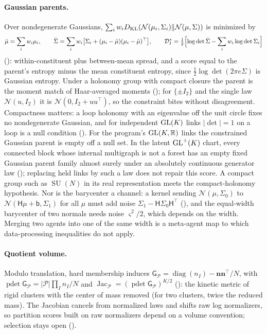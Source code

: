 \paragraph{Gaussian parents.} Over nondegenerate Gaussians,
\(\sum_iw_iD_{\mathrm{KL}}(\mathcal N(\mu_i,\Sigma_i)\Vert\mathcal N(\mu,\Sigma))\) is minimized by
\[
\bar\mu=\sum_iw_i\mu_i,\qquad
\bar\Sigma=\sum_iw_i\bigl[\Sigma_i+(\mu_i-\bar\mu)(\mu_i-\bar\mu)^\top\bigr],\qquad
\mathcal D_I^\star=\tfrac12\Bigl[\log\det\bar\Sigma-\sum_iw_i\log\det\Sigma_i\Bigr]
\]
(): within-constituent plus between-mean spread, and a score equal to the
parent's entropy minus the mean constituent entropy, since \(\tfrac12\log\det(2\pi e\Sigma)\) is Gaussian entropy. Under
a holonomy group with compact closure the parent is the moment match of Haar-averaged moments
(); for \(\{\pm I_2\}\) and the single law \(\mathcal N(u,I_2)\) it is
\(\mathcal N(0,I_2+uu^\top)\), so the constraint bites without disagreement. Compactness matters: a loop holonomy with
an eigenvalue off the unit circle fixes no nondegenerate Gaussian, and for independent \(\mathrm{GL}(K)\) links
\(\lvert\det\rvert=1\) on a loop is a null condition (). For the program's
\(\mathrm{GL}(K,\mathbb R)\) links the constrained Gaussian parent is empty off a null set. In the latent
\(\mathrm{GL}^+(K)\) chart, every connected block whose internal multigraph is not a forest has an empty
fixed Gaussian parent family almost surely under an absolutely continuous generator law
(); replacing held links by such a law does not repair
this score. A compact group such as \(\operatorname{SU}(N)\) in its real representation meets the
compact-holonomy hypothesis. Nor is the barycenter a channel: a kernel
sending \(\mathcal N(\mu,\Sigma_0)\) to \(\mathcal N(\mathsf H\mu+\mathsf b,\Sigma_1)\) for all \(\mu\) must add noise
\(\Sigma_1-\mathsf H\Sigma_0\mathsf H^\top\) (), and the equal-width barycenter of two
normals needs noise \(\varsigma^2/2\), which depends on the width. Merging two agents into one of the same width is a
meta-agent map to which data-processing inequalities do not apply.

\paragraph{Quotient volume.} Modulo translation, hard membership induces
\(\mathsf G_{\mathcal P}=\operatorname{diag}(n_I)-\mathbf n\mathbf n^\top/N\), with
\(\operatorname{pdet}\mathsf G_{\mathcal P}=\lvert\mathcal P\rvert\prod_In_I/N\) and
\(\operatorname{Jac}_{\mathcal P}=(\operatorname{pdet}\mathsf G_{\mathcal P})^{K/2}\) (): the kinetic
metric of rigid clusters with the center of mass removed (for two clusters, twice the reduced mass). The Jacobian
cancels from normalized laws and shifts raw log normalizers, so partition scores built on raw normalizers depend on
a volume convention; selection stays open ().

